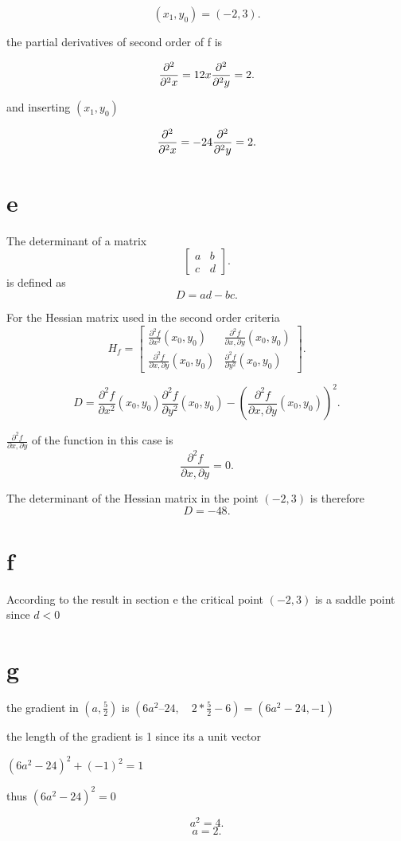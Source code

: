\documentclass[12pt,a4paper]{article}
\begin{document}
\[
	(x_1,y_0)=(-2,3)
.\] 

the partial derivatives of second order of f is


\[
\frac{\partial^2 }{\partial^2 x}=12x\\\frac{\partial^2 }{\partial^2 y} = 2 
.\] 

and inserting $(x_1,y_0)$ 

\[
\frac{\partial^2 }{\partial^2 x} =-24\\\frac{\partial^2 }{\partial^2 y} =2
.\] 


\section{e} 

The determinant of a matrix 
\[
\begin{bmatrix}
	 a & b \\ c & d 
\end{bmatrix}
.\] 
is defined as
\[
D=ad-bc
.\] 

For the Hessian matrix used in the second order criteria
\[
	H_{f}=\begin{bmatrix}  \frac{\partial^2f}{\partial x^2}(x_0,y_0) & \frac{\partial^2f}{\partial x,\partial y}(x_0,y_0)\\\frac{\partial^2 f}{\partial x, \partial y}(x_0,y_0) & \frac{\partial^2 f}{\partial y^2}(x_0,y_0) \end{bmatrix} 
.\] 

\[
	D=\frac{\partial^2f}{\partial x^2}(x_0,y_0)\frac{\partial^2 f}{\partial y^2}(x_0,y_0)-\left( \frac{\partial^2f}{\partial x,\partial y}(x_0,y_0) \right) ^2
.\] 

 $\frac{\partial^2f}{\partial x,\partial y} $ of the function in this case is \[
 \frac{\partial^2f}{\partial x,\partial y} = 0
 .\] 

 The determinant of the Hessian matrix in the point $(-2,3)$ is therefore
  \[
 D=-48
 .\] 

\section{f}

According to the result in section e the critical point $(-2,3)$ is a saddle point since  $d<0$

\section{g} 


the gradient in $(a,\frac{5}{2})$ is $(6a^2 – 24,\quad 2*\frac{5}{2}-6)=(6a^2-24, -1)$ 
 

the length of the gradient is 1 since its a unit vector

$(6a^2  -24)^2  +  (-1)^2  = 1$

thus $(6a^2  -24)^2  = 0$

 
 \[
a^2=4
.\] 
\[
a=2
.\] 
\end{document}

